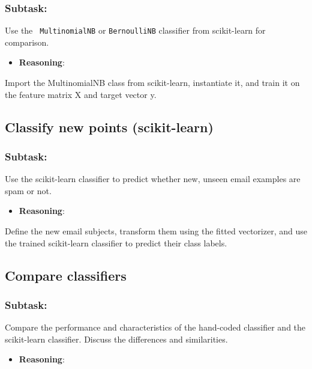 \documentclass[12pt,a4paper]{article}
\begin{document}
\subsubsection{Subtask:}
Use the \texttt{ MultinomialNB} or \texttt{BernoulliNB} classifier from scikit-learn for comparison.


\begin{itemize}
    \item \textbf{Reasoning}:
\end{itemize}

Import the MultinomialNB class from scikit-learn, instantiate it, and train it on the feature matrix X and target vector y.



\subsection{Classify new points (scikit-learn)}

\subsubsection{Subtask:}
Use the scikit-learn classifier to predict whether new, unseen email examples are spam or not.


\begin{itemize}
    \item \textbf{Reasoning}:
\end{itemize}

Define the new email subjects, transform them using the fitted vectorizer, and use the trained scikit-learn classifier to predict their class labels.



\subsection{Compare classifiers}

\subsubsection{Subtask:}
Compare the performance and characteristics of the hand-coded classifier and the scikit-learn classifier. Discuss the differences and similarities.


\begin{itemize}
    \item \textbf{Reasoning}:
\end{itemize}
\end{document}
